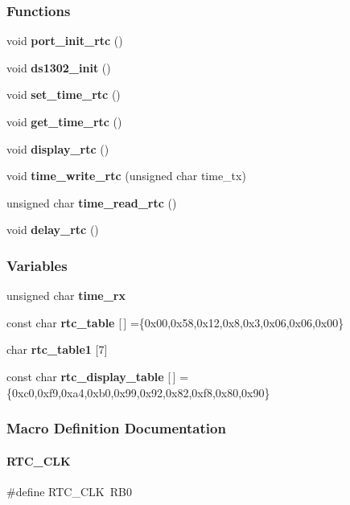 \subsubsection*{Functions}
\begin{DoxyCompactItemize}
\item 
void \textbf{ port\+\_\+init\+\_\+rtc} ()
\item 
void \textbf{ ds1302\+\_\+init} ()
\item 
void \textbf{ set\+\_\+time\+\_\+rtc} ()
\item 
void \textbf{ get\+\_\+time\+\_\+rtc} ()
\item 
void \textbf{ display\+\_\+rtc} ()
\item 
void \textbf{ time\+\_\+write\+\_\+rtc} (unsigned char time\+\_\+tx)
\item 
unsigned char \textbf{ time\+\_\+read\+\_\+rtc} ()
\item 
void \textbf{ delay\+\_\+rtc} ()
\end{DoxyCompactItemize}
\subsubsection*{Variables}
\begin{DoxyCompactItemize}
\item 
unsigned char \textbf{ time\+\_\+rx}
\item 
const char \textbf{ rtc\+\_\+table} [$\,$] =\{0x00,0x58,0x12,0x8,0x3,0x06,0x06,0x00\}
\item 
char \textbf{ rtc\+\_\+table1} [7]
\item 
const char \textbf{ rtc\+\_\+display\+\_\+table} [$\,$] =\{0xc0,0xf9,0xa4,0xb0,0x99,0x92,0x82,0xf8,0x80,0x90\}
\end{DoxyCompactItemize}


\subsubsection{Macro Definition Documentation}
\mbox{\label{a00044_a80e62c38e7452c92057864f26034ee82}} 
\paragraph{R\+T\+C\+\_\+\+C\+LK}
{\footnotesize\ttfamily \#define R\+T\+C\+\_\+\+C\+LK~R\+B0}

\mbox{\label{a00044_a4e7388c98e6856978dbc5b2e5cb5bed4}} 
